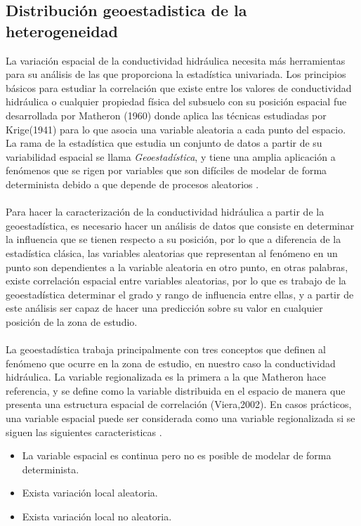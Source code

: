 \newpage

\subsection{Distribución geoestadistica de la heterogeneidad}

La variación espacial de la conductividad hidráulica necesita más herramientas para su análisis de las que proporciona la estadística univariada. Los principios básicos para estudiar la correlación que existe entre los valores de conductividad hidráulica o cualquier propiedad física del subsuelo con su posición espacial fue desarrollada por Matheron (1960) donde aplica las técnicas estudiadas por Krige(1941) para lo que asocia una variable aleatoria a cada punto del espacio. La rama de la estadística que estudia un conjunto de datos a partir de su variabilidad espacial se llama \emph{Geoestadística}, y tiene una amplia aplicación a fenómenos que se rigen por variables que son difíciles de modelar de forma determinista debido a que depende de procesos aleatorios \cite{Viera2002} \cite{Matheron1962} \cite{Krige1951}.
\\
\\
Para hacer la caracterización de la conductividad hidráulica a partir de la geoestadística, es necesario hacer un análisis de datos que consiste en determinar la influencia que se tienen respecto a su posición, por lo que a diferencia de la estadística clásica, las variables aleatorias que representan al fenómeno en un punto son dependientes a la variable aleatoria en otro punto, en otras palabras, existe correlación espacial entre variables aleatorias, por lo que es trabajo de la geoestadística determinar el grado y rango de influencia entre ellas, y a partir de este análisis ser capaz de hacer una predicción sobre su valor en cualquier posición de la zona de estudio.
\\
\\
La geoestadística trabaja principalmente con tres conceptos que definen al fenómeno que ocurre en la zona de estudio, en nuestro caso la conductividad hidráulica. La variable regionalizada es la primera a la que Matheron hace referencia, y se define como la variable distribuida en el espacio de manera que presenta una estructura espacial de correlación (Viera,2002). En casos prácticos, una variable espacial puede ser considerada como una variable regionalizada si se siguen las siguientes caracteristicas \cite{Rodriguez1999}\cite{Viera2002}.

\begin{itemize}
\item La variable espacial es continua pero no es posible de modelar de forma determinista. 
\item Exista variación local aleatoria.
\item Exista variación local no aleatoria.
\end{itemize}

